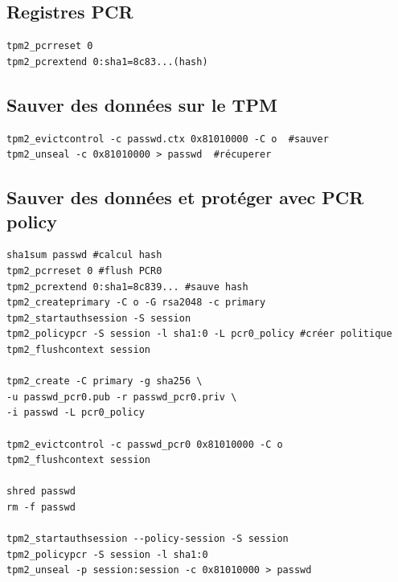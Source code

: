 \documentclass[resume]{subfiles}
\begin{document}
\subsection{Registres PCR}

\begin{lstlisting}[style=bash]
tpm2_pcrreset 0
tpm2_pcrextend 0:sha1=8c83...(hash)
\end{lstlisting}

\subsection{Sauver des données sur le TPM}

\begin{lstlisting}[style=bash]
tpm2_evictcontrol -c passwd.ctx 0x81010000 -C o  #sauver
tpm2_unseal -c 0x81010000 > passwd  #récuperer
\end{lstlisting}

\subsection{Sauver des données et protéger avec PCR policy}
\begin{lstlisting}[style=bash]
sha1sum passwd #calcul hash
tpm2_pcrreset 0 #flush PCR0
tpm2_pcrextend 0:sha1=8c839... #sauve hash
tpm2_createprimary -C o -G rsa2048 -c primary
tpm2_startauthsession -S session
tpm2_policypcr -S session -l sha1:0 -L pcr0_policy #créer politique
tpm2_flushcontext session

tpm2_create -C primary -g sha256 \
-u passwd_pcr0.pub -r passwd_pcr0.priv \
-i passwd -L pcr0_policy

tpm2_evictcontrol -c passwd_pcr0 0x81010000 -C o
tpm2_flushcontext session

shred passwd
rm -f passwd

tpm2_startauthsession --policy-session -S session
tpm2_policypcr -S session -l sha1:0
tpm2_unseal -p session:session -c 0x81010000 > passwd
\end{lstlisting}
\end{document}
